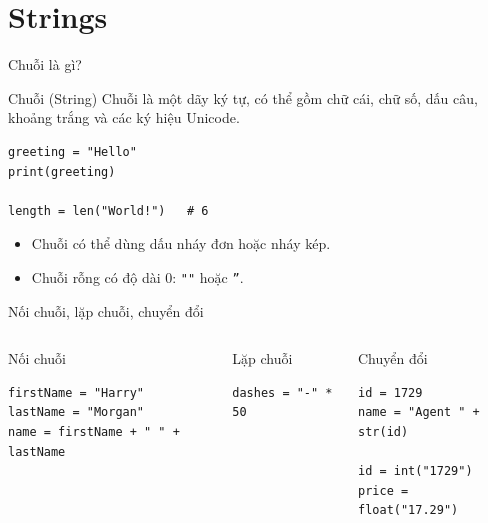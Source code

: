 \documentclass[aspectratio=169,10pt]{beamer}
\begin{document}
\section{Strings}

\begin{frame}[fragile]{Chuỗi là gì?}
\begin{block}{Chuỗi (String)}
Chuỗi là một dãy ký tự, có thể gồm chữ cái, chữ số, dấu câu, khoảng trắng và các ký hiệu Unicode.
\end{block}
\begin{lstlisting}
greeting = "Hello"
print(greeting)

length = len("World!")   # 6
\end{lstlisting}
\begin{itemize}
  \item Chuỗi có thể dùng dấu nháy đơn hoặc nháy kép.
  \item Chuỗi rỗng có độ dài 0: \texttt{""} hoặc \texttt{''}.
\end{itemize}
\end{frame}

\begin{frame}[fragile]{Nối chuỗi, lặp chuỗi, chuyển đổi}
\begin{columns}[T,onlytextwidth]
\begin{block}{Nối chuỗi}
\begin{lstlisting}
firstName = "Harry"
lastName = "Morgan"
name = firstName + " " + lastName
\end{lstlisting}
\end{block}
\begin{block}{Lặp chuỗi}
\begin{lstlisting}
dashes = "-" * 50
\end{lstlisting}
\end{block}
\begin{block}{Chuyển đổi}
\begin{lstlisting}
id = 1729
name = "Agent " + str(id)

id = int("1729")
price = float("17.29")
\end{lstlisting}
\end{block}
\end{columns}
\end{frame}
\end{document}
